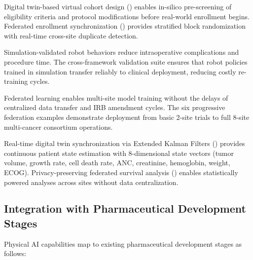 \documentclass[11pt,letterpaper]{article}
\begin{document}
\begin{description}[leftmargin=3.5cm, style=sameline]
  \item[Enrollment Efficiency] Digital twin-based virtual cohort design () enables in-silico pre-screening of eligibility criteria and protocol modifications before real-world enrollment begins. Federated enrollment synchronization () provides stratified block randomization with real-time cross-site duplicate detection.

  \item[Per-Patient Costs] Simulation-validated robot behaviors reduce intraoperative complications and procedure time. The cross-framework validation suite ensures that robot policies trained in simulation transfer reliably to clinical deployment, reducing costly re-training cycles.

  \item[Timeline Acceleration] Federated learning enables multi-site model training without the delays of centralized data transfer and IRB amendment cycles. The six progressive federation examples demonstrate deployment from basic 2-site trials to full 8-site multi-cancer consortium operations.

  \item[Endpoint Quality] Real-time digital twin synchronization via Extended Kalman Filters () provides continuous patient state estimation with 8-dimensional state vectors (tumor volume, growth rate, cell death rate, ANC, creatinine, hemoglobin, weight, ECOG). Privacy-preserving federated survival analysis () enables statistically powered analyses across sites without data centralization.
\end{description}

\subsection{Integration with Pharmaceutical Development Stages}

Physical AI capabilities map to existing pharmaceutical development stages as follows:
\end{document}
